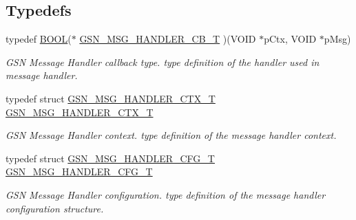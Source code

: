 \subsection*{Typedefs}
\begin{DoxyCompactItemize}
\item 
typedef \hyperlink{a00660_ga1f04022c0a182c51c059438790ea138c}{BOOL}($\ast$ \hyperlink{a00627_ga638c4ec452bde3b70fae3b7239e05cca}{GSN\_\-MSG\_\-HANDLER\_\-CB\_\-T} )(VOID $\ast$pCtx, VOID $\ast$pMsg)
\begin{DoxyCompactList}\small\item\em GSN Message Handler callback type. type definition of the handler used in message handler. \end{DoxyCompactList}\item 
typedef struct \hyperlink{a00155}{GSN\_\-MSG\_\-HANDLER\_\-CTX\_\-T} \hyperlink{a00627_gaf399ebe34f6e083a27eab240f852ac4d}{GSN\_\-MSG\_\-HANDLER\_\-CTX\_\-T}
\begin{DoxyCompactList}\small\item\em GSN Message Handler context. type definition of the message handler context. \end{DoxyCompactList}\item 
typedef struct \hyperlink{a00154}{GSN\_\-MSG\_\-HANDLER\_\-CFG\_\-T} \hyperlink{a00627_gafb3b653c75d46a7789b82f2f3aff8321}{GSN\_\-MSG\_\-HANDLER\_\-CFG\_\-T}
\begin{DoxyCompactList}\small\item\em GSN Message Handler configuration. type definition of the message handler configuration structure. \end{DoxyCompactList}\end{DoxyCompactItemize}
